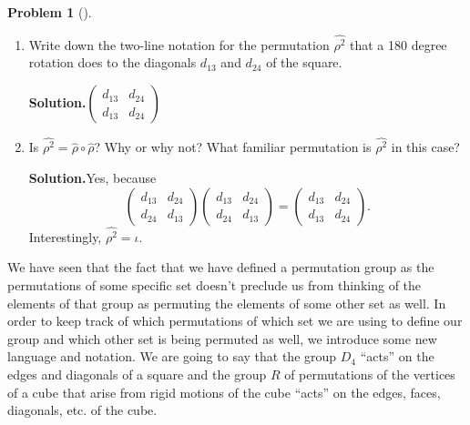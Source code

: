 \documentclass[10pt,]{book}
\theoremstyle{plain}
\theoremstyle{definition}
\newtheorem{activity}[project]{Problem}
\theoremstyle{definition}
\numberwithin{equation}{chapter}
\begin{document}
\begin{activity}[]
\begin{enumerate}[font=\bfseries,label=(\alph*),ref=\alph*]
\item\label{task-199} Write down the two-line notation for the permutation \(\widehat{\rho^2}\) that a 180 degree rotation does to the diagonals \(d_{13}\) and \(d_{24}\) of the square.%
\par\medskip\noindent%
\textbf{Solution.}\quad \(\displaystyle\begin{pmatrix} d_{13}& d_{24}\\ d_{13}& d_{24}\end{pmatrix}\)%
\item\label{task-200} Is \(\widehat{\rho^2} = \widehat{\rho}\circ\widehat{\rho}\)? Why or why not? What familiar permutation is \(\widehat{\rho^2}\) in this case?%
\par\medskip\noindent%
\textbf{Solution.}\quad Yes, because%
\begin{equation*}
\displaystyle\begin{pmatrix} d_{13}& d_{24}\\ d_{24}& d_{13}\end{pmatrix}\begin{pmatrix} d_{13}& d_{24}\\ d_{24}& d_{13}\end{pmatrix} = \begin{pmatrix} d_{13}& d_{24}\\ d_{13}& d_{24}\end{pmatrix}\text{.}
\end{equation*}
Interestingly, \(\widehat{\rho^2} = \iota\).%
\end{enumerate}
\end{activity}
We have seen that the fact that we have defined a permutation group as the permutations of some specific set doesn't preclude us from thinking of the elements of that group as permuting the elements of some other set as well. In order to keep track of which permutations of which set we are using to define our group and which other set is being permuted as well, we introduce some new language and notation. We are going to say that the group \(D_4\) ``acts'' on the edges and diagonals of a square and the group \(R\) of permutations of the vertices of a cube that arise from rigid motions of the cube ``acts'' on the edges, faces, diagonals, etc. of the cube.%
\end{document}
